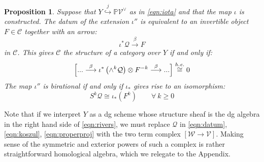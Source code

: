 \documentclass[12pt]{amsart}
\numberwithin{equation}{section}
\newtheorem{proposition}[theorem]{Proposition}
\theoremstyle{definition}
\theoremstyle{remark}
\newcommand{\PP}{\mathbb{P}}
\newcommand{\cat}{\mathcal{C}}
\newcommand{\CQ}{\mathcal{Q}}
\newcommand{\CV}{\mathcal{V}}
\newcommand{\CW}{\mathcal{W}}
\renewcommand{\1}{\mathbf{1}}
\newcommand{\ehe}{\emph{h.e.}}
\begin{document}
\begin{proposition}
\label{prop:lift}
Suppose that $Y \stackrel{j}\hookrightarrow \PP \CV^{\vee}$ as in \eqref{eqn:iota} and that the map $\iota$ is constructed. The datum of the extension $\iota''$ is equivalent to an invertible object $F \in \cat$ together with an arrow:
\begin{equation}
\label{eqn:datum}
\iota^* \CQ \stackrel{\beta}\longrightarrow F
\end{equation}
in $\cat$. This gives $\cat$ the structure of a category over $Y$ if and only if:
\begin{equation}
\label{eqn:koszul}
\left[ ... \stackrel{\beta}\longrightarrow \iota^*\left(\wedge^k \CQ \right) \otimes F^{-k} \stackrel{\beta}\longrightarrow ... \right] \stackrel{\ehe}\cong 0
\end{equation}
The map $\iota''$ is birational if and only if $\iota_*$ gives rise to an isomorphism:
\begin{equation}
\label{eqn:properproj}
S^k \CQ \cong \iota_*(F^k) \qquad \forall \ k\geq 0
\end{equation}
\end{proposition}

Note that if we interpret $Y$ as a dg scheme whose structure sheaf is the dg algebra in the right hand side of \eqref{eqn:rivers}, we must replace $\CQ$ in \eqref{eqn:datum}, \eqref{eqn:koszul},  \eqref{eqn:properproj} with the two term complex $[\CW\rightarrow\CV]$. Making sense of the symmetric and exterior powers of such a complex is rather straightforward homological algebra, which we relegate to the Appendix.
\end{document}
